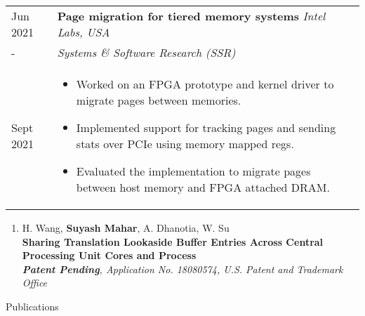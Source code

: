 \documentclass{article}
\newlength{\workexitemsep}
\newlength{\sectionbottommargin}
\newlength{\durlen}
\newlength{\deslen}
\newenvironment{nothing}{}
\newcommand{\sectiontitle}[1]{
  \textbf{\Large{\sffamily #1}}
  \begin{flushright}
      \vspace{-0.48cm} 
      \rule{0.975\textwidth}{1.1pt}
  \end{flushright}
  \vspace{-0.1cm} 
}
\begin{document}
\begin{tabular}{p{\durlen} p{\deslen}}
  \centering Jun 2021       & \textbf{Page migration for tiered memory systems} \hfill \textit{Intel Labs, USA} \\
  \centering -              & \textit{Systems \& Software Research (SSR)} \\ 
  \centering Sept 2021      & \vspace{-0.6cm}\begin{itemize}[itemsep=\workexitemsep] 
          \item Worked on an FPGA prototype and kernel driver to migrate pages between memories.
          \item Implemented support for tracking pages and sending stats over PCIe using memory mapped regs.
          \item Evaluated the implementation to migrate pages between host memory and FPGA attached DRAM.
  \end{itemize}
\end{tabular}

\vspace{-0.2cm}


\vspace{-3mm}

\begin{nothing}
    \vspace{\sectionbottommargin} 
    
    \ifdefined\resume
        \vspace{-0.2cm} 
    \fi 

    \begin{enumerate}
            \item H. Wang, \textbf{Suyash Mahar}, A. Dhanotia, W. Su\\
        \textbf{Sharing Translation Lookaside Buffer Entries Across Central Processing Unit 
          Cores and Process} \\
        {\it\footnotesize \textbf{Patent Pending}, Application No. 18080574, U.S. Patent and Trademark Office}
        
    \end{enumerate}
\end{nothing}


\sectiontitle{Publications} 
\end{document}

